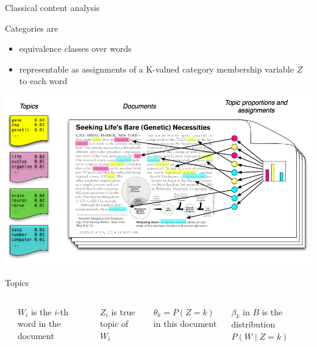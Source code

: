 \documentclass{hertieteaching}
\begin{document}
\begin{frame}{Classical content analysis}

Categories are
\begin{itemize}
\item
  equivalence classes over words\item
  representable as assignments of a K-valued category membership
  variable \(Z\) to each word
\end{itemize}

\begin{center}\includegraphics[width=0.6\linewidth]{pictures/topics2} \end{center}

\end{frame}

\begin{frame}{Topics}

\begin{columns}[T,onlytextwidth]

\begin{center}
\end{center}


$W_i$ is the $i$-th word in the document
\medskip

$Z_i$ is true topic of $W_i$
\medskip

$\theta_k = P(Z = k)$ in this document
\medskip

$\beta_k$ in $B$ is the distribution $P(W \mid Z = k)$ 

\end{columns}

\end{frame}
\end{document}
